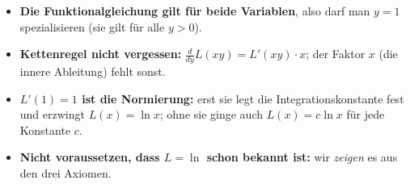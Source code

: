 \begin{achtung}
\begin{itemize}
  \item \textbf{Die Funktionalgleichung gilt für beide Variablen}, also
        darf man $y=1$ spezialisieren (sie gilt für alle $y>0$).
  \item \textbf{Kettenregel nicht vergessen:}
        $\frac d{dy}L(xy)=L'(xy)\cdot x$; der Faktor $x$ (die innere
        Ableitung) fehlt sonst.
  \item \textbf{$L'(1)=1$ ist die Normierung:} erst sie legt die
        Integrationskonstante fest und erzwingt $L(x)=\ln x$; ohne sie
        ginge auch $L(x)=c\ln x$ für jede Konstante $c$.
  \item \textbf{Nicht voraussetzen, dass $L=\ln$ schon bekannt ist:} wir
        \emph{zeigen} es aus den drei Axiomen.
\end{itemize}
\end{achtung}
